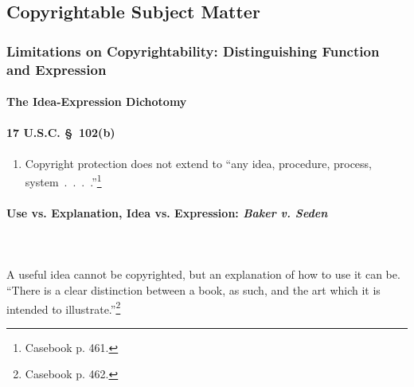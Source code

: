 \subsection{Copyrightable Subject Matter}

\subsubsection{Limitations on Copyrightability: Distinguishing Function and 
Expression}

\paragraph{The Idea-Expression Dichotomy}

\paragraph{17 U.S.C. \S\ 102(b)}

\begin{enumerate}
    \item Copyright protection does not extend to ``any idea, procedure, 
    process, system~.~.~.~.''\footnote{Casebook p. 461.}
\end{enumerate}

\paragraph{Use vs. Explanation, Idea vs. Expression: \emph{Baker v. Seden}}
~\\\\
A useful idea cannot be copyrighted, but an explanation of how to use it can 
be. ``There is a clear distinction between a book, as such, and the art which 
it is intended to illustrate.''\footnote{Casebook p. 462.}

